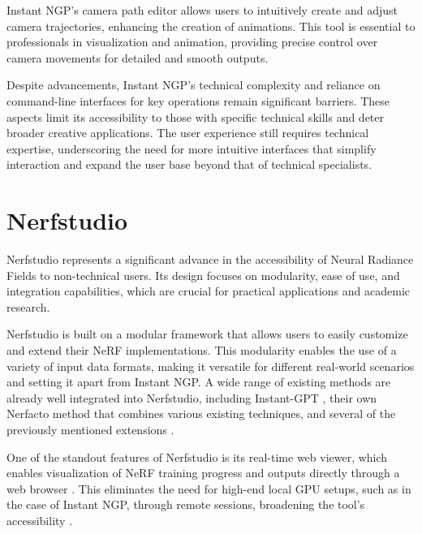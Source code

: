 Instant NGP's camera path editor allows users to intuitively create and adjust camera trajectories, enhancing the creation of animations.
This tool is essential to professionals in visualization and animation, providing precise control over camera movements for detailed and smooth outputs.

Despite advancements, Instant NGP's technical complexity and reliance on command-line interfaces for key operations remain significant barriers.
These aspects limit its accessibility to those with specific technical skills and deter broader creative applications.
The user experience still requires technical expertise, underscoring the need for more intuitive interfaces that simplify interaction and expand the user base beyond that of technical specialists.

\section{Nerfstudio}
\label{sec:related:nerfstudio}

Nerfstudio \cite{tancik_nerfstudio_2023} represents a significant advance in the accessibility of Neural Radiance Fields to non-technical users.
Its design focuses on modularity, ease of use, and integration capabilities, which are crucial for practical applications and academic research.

Nerfstudio is built on a modular framework that allows users to easily customize and extend their NeRF implementations.
This modularity enables the use of a variety of input data formats, making it versatile for different real-world scenarios and setting it apart from Instant NGP.
A wide range of existing methods are already well integrated into Nerfstudio, including Instant-GPT \cite{muller_instant_2022}, their own Nerfacto \cite{noauthor_nerfacto_nodate} method that combines various existing techniques, and several of the previously mentioned extensions \cite{haque_instruct-nerf2nerf_2023,jan-niklas_dihlmann_signerf_2024}.

One of the standout features of Nerfstudio is its real-time web viewer, which enables visualization of NeRF training progress and outputs directly through a web browser .
This eliminates the need for high-end local GPU setups, such as in the case of Instant NGP, through remote sessions, broadening the tool's accessibility \cite{noauthor_nerfstudio-projectviser_2024}.

